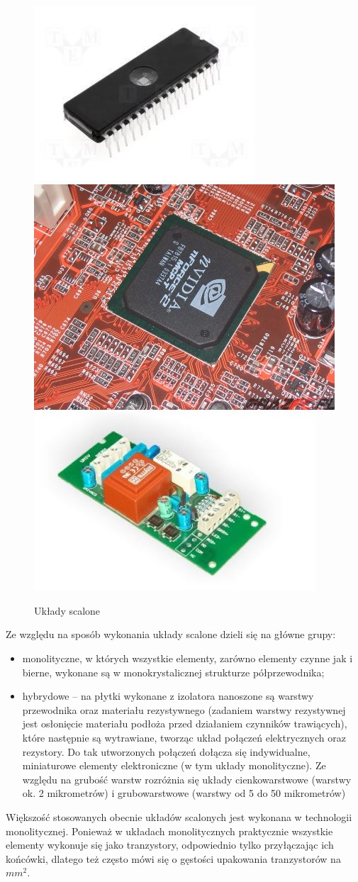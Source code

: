 \documentclass[a4paper,11pt]{article}
\begin{document}
\begin{figure}[!htb]
\centerline{
\includegraphics[width=0.3\textwidth;]{uklad1.jpg}
\includegraphics[width=0.3\textwidth;]{uklad2.jpg}
\includegraphics[width=0.3\textwidth;]{uklad3.jpg}}
\caption{Układy scalone}
\label{fig:uklady3}
\end{figure}
      Ze względu na sposób wykonania układy scalone dzieli się na główne grupy: 
      \begin{itemize}
      
      \item{
      monolityczne, w których wszystkie elementy, zarówno elementy czynne jak i bierne, wykonane są w monokrystalicznej strukturze półprzewodnika;}
      \item{ 
      hybrydowe -- na płytki wykonane z izolatora nanoszone są warstwy przewodnika oraz materiału rezystywnego (zadaniem warstwy rezystywnej jest osłonięcie materiału podłoża przed działaniem czynników trawiących), które następnie są wytrawiane, tworząc układ połączeń elektrycznych oraz rezystory. Do tak utworzonych połączeń dołącza się indywidualne, miniaturowe elementy elektroniczne (w tym układy monolityczne). Ze względu na grubość warstw rozróżnia się układy cienkowarstwowe (warstwy ok. 2 mikrometrów) i grubowarstwowe (warstwy od 5 do 50 mikrometrów)}
      \end{itemize}

       Większość stosowanych obecnie układów scalonych jest wykonana w technologii monolitycznej. Ponieważ w układach monolitycznych praktycznie wszystkie elementy wykonuje się jako tranzystory, odpowiednio tylko przyłączając ich końcówki, dlatego też często mówi się o gęstości upakowania tranzystorów na \(mm^2\).
       
\end{document}
